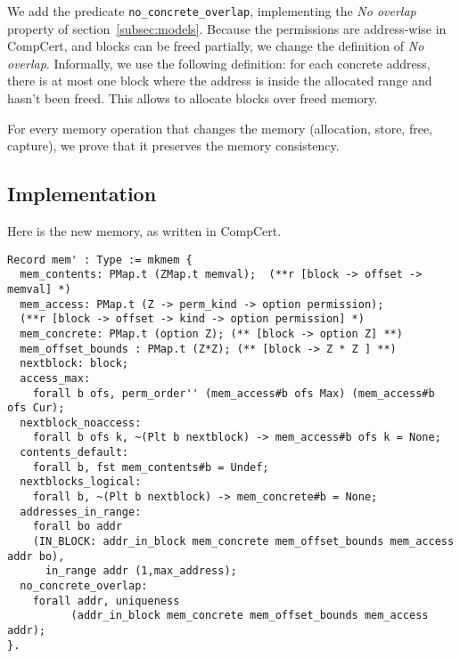 We add the predicate \texttt{no\_concrete\_overlap}, implementing the \textit{No overlap} property of section~\ref{subsec:models}. Because the permissions are address-wise in CompCert, and blocks can be freed partially, we change the definition of \textit{No overlap}. Informally, we use the following definition: for each concrete address, there is at most one block where the address is inside the allocated range and hasn't been freed. This allows to allocate blocks over freed memory.

For every memory operation that changes the memory (allocation, store, free, capture), we prove that it preserves the memory consistency.

\subsection{Implementation}
Here is the new memory, as written in CompCert.
{\footnotesize
\begin{lstlisting}
Record mem' : Type := mkmem {
  mem_contents: PMap.t (ZMap.t memval);  (**r [block -> offset -> memval] *)
  mem_access: PMap.t (Z -> perm_kind -> option permission);
  (**r [block -> offset -> kind -> option permission] *)
  mem_concrete: PMap.t (option Z); (** [block -> option Z] **)
  mem_offset_bounds : PMap.t (Z*Z); (** [block -> Z * Z ] **)
  nextblock: block;
  access_max:
    forall b ofs, perm_order'' (mem_access#b ofs Max) (mem_access#b ofs Cur);
  nextblock_noaccess:
    forall b ofs k, ~(Plt b nextblock) -> mem_access#b ofs k = None;
  contents_default:
    forall b, fst mem_contents#b = Undef;
  nextblocks_logical:
    forall b, ~(Plt b nextblock) -> mem_concrete#b = None;
  addresses_in_range:
    forall bo addr
    (IN_BLOCK: addr_in_block mem_concrete mem_offset_bounds mem_access addr bo),
      in_range addr (1,max_address);
  no_concrete_overlap:
    forall addr, uniqueness
          (addr_in_block mem_concrete mem_offset_bounds mem_access addr);
}.
\end{lstlisting}}
